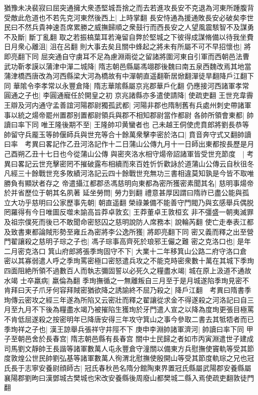 猶豫未决裴寂曰屈突通擁大衆憑堅城吾捨之而去若進攻長安不克退為河東所踵腹背受敵此危道也不若先克河東然後西上|{
	上時掌翻}
長安恃通為援通敗長安必破矣李世民曰不然兵貴神速吾席累勝之威撫歸順之衆鼓行而西長安之人望風震駭智不及謀勇不及斷|{
	斷丁亂翻}
取之若振槁葉耳若淹留自弊於堅城之下彼得成謀脩備以待我坐費日月衆心離沮|{
	沮在呂翻}
則大事去矣且關中蜂起之將未有所屬不可不早招懷也|{
	將即亮翻下同}
屈突通自守虜耳不足為慮淵兩從之留諸將圍河東自引軍而西朝邑法曹武功靳孝謨以蒲津中潬二城降|{
	隋志朝邑縣屬馮翊郡後魏曰南五泉西魏改焉其地當蒲津橋西唐改為河西縣梁大河為橋故有中潬朝直遥翻靳居焮翻潬徒旱翻降戶江翻下同}
華隂令李孝常以永豐倉降|{
	隋志華隂縣屬京兆郡華戶化翻}
仍應接河西諸軍孝常圓通之子也|{
	李圓通寵任於開皇之初}
京兆諸縣亦多遣使請降|{
	使疏吏翻}
王世充韋霽王辯及河内通守孟善誼河陽郡尉獨孤武都|{
	河陽非郡也隋制舊有兵處州刺史帶諸軍事以統之煬帝罷州置郡别置都尉領兵與郡不相知郡尉當作都尉}
各帥所領會東都|{
	帥讀曰率下同}
唯王隆後期不至|{
	王隆帥卭黄蠻者也}
己未越王侗使虎賁郎將劉長恭等帥留守兵龎玉等帥偃師兵與世充等合十餘萬衆擊李密於洛口|{
	賁音奔守式又翻帥讀曰率　考異曰畧記作乙丑河洛記作十二日蒲山公傳九月十一日師出東都按長歷是月己酉朔乙丑十七日也今從蒲山公傳}
與密夾洛水相守煬帝詔諸軍皆受世充節度　|{
	考異曰畧記云世充擊密罔不摧破露布相續而來百姓忻忻歡詠於道蒲山公傳云自秋徂冬凡經三十餘戰世充多敗績河洛記云四十餘戰世充無功三書相違莫知孰是今皆不取唯勝負有顯狀者存之}
帝遣攝江都郡丞馮慈明向東都為密所獲密素聞其名|{
	慈明事煬帝於并省歷位于朝其名夙著}
延坐勞問|{
	勞力到翻}
禮意甚厚因謂曰隋祚已盡公能與孤立大功乎慈明曰公家歷事先朝|{
	朝直遥翻}
榮祿兼備不能善守門閥乃與玄感舉兵偶脱罔羅得有今日唯圖反噬未諭高旨莽卓敦玄|{
	王莽董卓王敦桓玄}
非不彊盛一朝夷滅罪及祖宗僕死而後已不敢聞命密怒囚之慈明說防人席務本|{
	說輪芮翻}
使亡走奉表江都及致書東都論賊形勢至雍丘為密將李公逸所獲|{
	將即亮翻下同}
密又義而釋之出至營門翟讓殺之慈明子琮之子也|{
	馮子琮事高齊死於琅邪王儼之難}
密之克洛口也|{
	是年二月密克洛口}
箕山府郎將張季珣固守不下|{
	大業十二年移箕山公路二府守洛口倉}
密以其寡弱遣人呼之季珣罵密極口密怒遣兵攻之不能克時密衆數十萬在其城下季珣四面阻絶所領不過數百人而執志彌固誓以必死久之糧盡水竭|{
	城在原上汲道不通故水竭}
士卒羸病|{
	羸倫為翻}
季珣撫循之一無離叛自三月至于是月城遂陷季珣見密不肯拜曰天子爪牙何容拜賊密猶欲降之誘諭終不屈乃殺之|{
	降戶江翻　考異曰隋書季珣傳云密攻之經三年遂為所陷又云密壯而釋之翟讓從求金不得遂殺之河洛記曰自三月至九月不下後為糧盡水竭乃被摧陷生獲珣於牙門遣人宣之以降為度珣更張目極罵不肯低屈遂殺之按密明年已降唐安得三年攻守箕山之事今參取二書去其牴牾者而已}
季珣祥之子也|{
	漢王諒舉兵張祥守井陘不下}
庚申李淵帥諸軍濟河|{
	帥讀曰率下同}
甲子至朝邑舍於長春宫|{
	隋志朝邑縣有長春宫}
關中士民歸之者如市丙寅淵遣世子建成司馬劉文靜帥王長諧等諸軍數萬人屯永豐倉守潼關以備東方兵慰撫使竇軌等受其節度敦煌公世民帥劉弘基等諸軍數萬人徇渭北慰撫使殷開山等受其節度軌琮之兄也冠氏長于志寧安養尉顔師古|{
	冠氏春秋邑名隋分館陶東界置冠氏縣屬武陽郡安養縣屬襄陽郡劉昫曰漢鄧城古樊城也宋改安養縣後周廢山都樊城二縣入焉使疏吏翻敦徒門翻}
